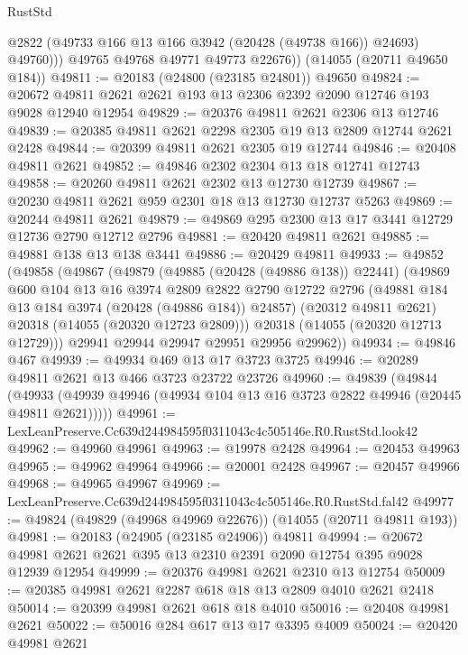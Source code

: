 \begin{lexlean}{RustStd}
\begin{coremodule}
              @2822
              (@49733 @166 @13 @166 @3942 (@20428 (@49738 @166)) @24693)
              @49760)))
        @49765
        @49768
        @49771
        @49773
        @22676))
    (@14055 (@20711 @49650 @184))
@49811 := @20183 (@24800 (@23185 @24801)) @49650
@49824 := @20672 @49811 @2621 @2621 @193 @13 @2306 @2392 @2090 @12746 @193 @9028 @12940 @12954
@49829 := @20376 @49811 @2621 @2306 @13 @12746
@49839 := @20385 @49811 @2621 @2298 @2305 @19 @13 @2809 @12744 @2621 @2428
@49844 := @20399 @49811 @2621 @2305 @19 @12744
@49846 := @20408 @49811 @2621
@49852 := @49846 @2302 @2304 @13 @18 @12741 @12743
@49858 := @20260 @49811 @2621 @2302 @13 @12730 @12739
@49867 := @20230 @49811 @2621 @959 @2301 @18 @13 @12730 @12737 @5263
@49869 := @20244 @49811 @2621
@49879 := @49869 @295 @2300 @13 @17 @3441 @12729 @12736 @2790 @12712 @2796
@49881 := @20420 @49811 @2621
@49885 := @49881 @138 @13 @138 @3441
@49886 := @20429 @49811
@49933 := @49852
    (@49858
      (@49867
        (@49879
          (@49885 (@20428 (@49886 @138)) @22441)
          (@49869
            @600
            @104
            @13
            @16
            @3974
            @2809
            @2822
            @2790
            @12722
            @2796
            (@49881 @184 @13 @184 @3974 (@20428 (@49886 @184)) @24857)
            (@20312 @49811 @2621)
            @20318
            (@14055 (@20320 @12723 @2809)))
          @20318
          (@14055 (@20320 @12713 @12729)))
        @29941
        @29944
        @29947
        @29951
        @29956
        @29962))
@49934 := @49846 @467
@49939 := @49934 @469 @13 @17 @3723 @3725
@49946 := @20289 @49811 @2621 @13 @466 @3723 @23722 @23726
@49960 := @49839
    (@49844 (@49933 (@49939 @49946 (@49934 @104 @13 @16 @3723 @2822 @49946 (@20445 @49811 @2621)))))
@49961 := LexLeanPreserve.Cc639d244984595f0311043c4c505146e.R0.RustStd.look42
@49962 := @49960 @49961
@49963 := @19978 @2428
@49964 := @20453 @49963
@49965 := @49962 @49964
@49966 := @20001 @2428
@49967 := @20457 @49966
@49968 := @49965 @49967
@49969 := LexLeanPreserve.Cc639d244984595f0311043c4c505146e.R0.RustStd.fal42
@49977 := @49824 (@49829 (@49968 @49969 @22676)) (@14055 (@20711 @49811 @193))
@49981 := @20183 (@24905 (@23185 @24906)) @49811
@49994 := @20672 @49981 @2621 @2621 @395 @13 @2310 @2391 @2090 @12754 @395 @9028 @12939 @12954
@49999 := @20376 @49981 @2621 @2310 @13 @12754
@50009 := @20385 @49981 @2621 @2287 @618 @18 @13 @2809 @4010 @2621 @2418
@50014 := @20399 @49981 @2621 @618 @18 @4010
@50016 := @20408 @49981 @2621
@50022 := @50016 @284 @617 @13 @17 @3395 @4009
@50024 := @20420 @49981 @2621

\end{coremodule}
\end{lexlean}
